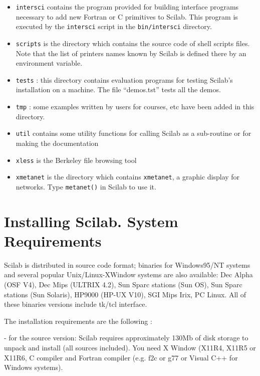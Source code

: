 \begin{itemize}
\item{{\tt intersci} contains the program provided for building
interface programs necessary to add new Fortran or C 
primitives to Scilab. This program is executed by the {\tt intersci}
script in the {\tt bin/intersci} directory.}

\item{{\tt scripts} is the directory which contains the source code of 
shell scripts files. Note that the list of printers  
names known by Scilab is defined there by an environment variable.}

\item{{\tt tests} : this directory contains evaluation programs for testing 
Scilab's installation on a machine. The file ``demos.tst'' tests all the 
demos.}

\item{{\tt tmp} : some examples written by users for courses, etc have been
added in this directory. }

\item{{\tt util} contains some utility functions for calling Scilab as a
sub-routine or for making the documentation }

\item{{\tt xless} is the Berkeley file browsing tool}

\item{{\tt xmetanet} is the directory which contains {\tt xmetanet}, a 
graphic display for networks. Type {\tt metanet()} in Scilab to use it.}

\end{itemize}

\section{Installing Scilab. System Requirements}
\label{install}
Scilab is distributed in source code format; binaries for Windows95/NT
systems and several popular Unix/Linux-XWindow systems are also
available: Dec Alpha (OSF V4), Dec Mips (ULTRIX 4.2), Sun Sparc
stations (Sun OS), Sun Sparc stations (Sun Solaris), HP9000 (HP-UX
V10), SGI Mips Irix, PC Linux. All of these binaries versions include
tk/tcl interface.

The installation requirements are the following :

- for the source version: Scilab requires approximately 130Mb of disk
storage to unpack and install (all sources included).  You need X
Window (X11R4, X11R5 or X11R6, C compiler and Fortran compiler
(e.g. f2c or g77 or Visual C++ for Windows systems). 
  
